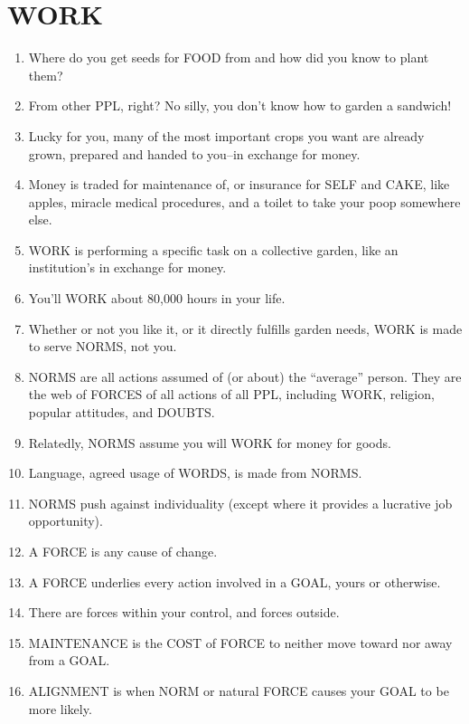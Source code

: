 \documentclass[
]{book}
\begin{document}
\hypertarget{work}{%
\section{WORK}\label{work}}

\begin{enumerate}
\def\labelenumi{\arabic{enumi}.}
\setcounter{enumi}{5}
\item
  Where do you get seeds for FOOD from and how did you know to plant them?
\item
  From other PPL, right? No silly, you don't know how to garden a sandwich!
\item
  Lucky for you, many of the most important crops you want are already grown, prepared and handed to you--in exchange for money.
\item
  Money is traded for maintenance of, or insurance for SELF and CAKE, like apples, miracle medical procedures, and a toilet to take your poop somewhere else.
\item
  WORK is performing a specific task on a collective garden, like an institution's in exchange for money.
\item
  You'll WORK about 80,000 hours in your life.
\item
  Whether or not you like it, or it directly fulfills garden needs, WORK is made to serve NORMS, not you.
\item
  NORMS are all actions assumed of (or about) the ``average'' person. They are the web of FORCES of all actions of all PPL, including
  WORK, religion, popular attitudes, and DOUBTS.
\item
  Relatedly, NORMS assume you will WORK for money for goods.
\item
  Language, agreed usage of WORDS, is made from NORMS.
\item
  NORMS push against individuality (except where it provides a lucrative job opportunity).
\item
  A FORCE is any cause of change.
\item
  A FORCE underlies every action involved in a GOAL, yours or
  otherwise.
\item
  There are forces within your control, and forces outside.
\item
  MAINTENANCE is the COST of FORCE to neither move toward nor
  away from a GOAL.
\item
  ALIGNMENT is when NORM or natural FORCE causes your GOAL to be
  more likely.


\end{enumerate}
\end{document}
